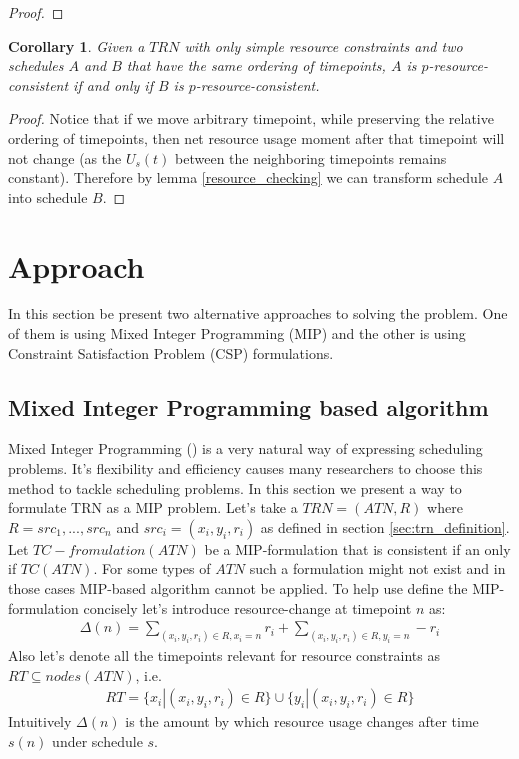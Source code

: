 \documentclass{article}
\newtheorem{corollary}{Corollary}[theorem]
\begin{document}
\begin{multicols}{2}
\begin{proof}
\end{proof}
\begin{corollary}
\label{cor:ordering}
Given a $TRN$ with only simple resource constraints and two schedules $A$ and $B$ that have the same ordering of timepoints, $A$ is $p$-resource-consistent if and only if $B$ is $p$-resource-consistent.
\end{corollary}
\begin{proof}
Notice that if we move arbitrary timepoint, while preserving the relative ordering of timepoints, then net resource usage moment after that timepoint will not change (as the $U_s(t)$ between the neighboring timepoints remains constant). Therefore by lemma \ref{resource_checking} we can transform schedule $A$ into schedule $B$.
\end{proof}


\section{Approach}
In this section be present two alternative approaches to solving the problem. One of them is using Mixed Integer Programming (MIP) and the other is using Constraint Satisfaction Problem (CSP) formulations.
\subsection{Mixed Integer Programming based algorithm}
Mixed Integer Programming (\cite{markowitz1957solution}) is a very natural way of expressing scheduling problems. It's flexibility and efficiency causes many researchers to choose this method to tackle scheduling problems. In this section we present a way to formulate TRN as a MIP problem. Let's take a $TRN=(ATN, R)$ where $R={src_1, ..., src_n}$ and $src_i = (x_i, y_i, r_i)$ as defined in section \ref{sec:trn_definition}. Let $TC-fromulation(ATN)$ be a MIP-formulation that is consistent if an only if $TC(ATN)$. For some types of $ATN$ such a formulation might not exist and in those cases MIP-based algorithm cannot be applied. To help use define the MIP-formulation concisely let's introduce resource-change at timepoint $n$ as:
\begin{align*}
\Delta(n) = \sum_{(x_i, y_i, r_i) \in R, x_i = n} r_i + \sum_{(x_i, y_i, r_i) \in R, y_i = n} -r_i
\end{align*}
Also let's denote all the timepoints relevant for resource constraints as $RT \subseteq nodes(ATN)$, i.e.
\begin{align*}
RT = \{ x_i | (x_i, y_i, r_i) \in R \} \cup \{ y_i | (x_i, y_i, r_i) \in R \}
\end{align*}
Intuitively $\Delta(n)$ is the amount by which resource usage changes after time $s(n)$ under schedule $s$.


\end{multicols}
\end{document}
